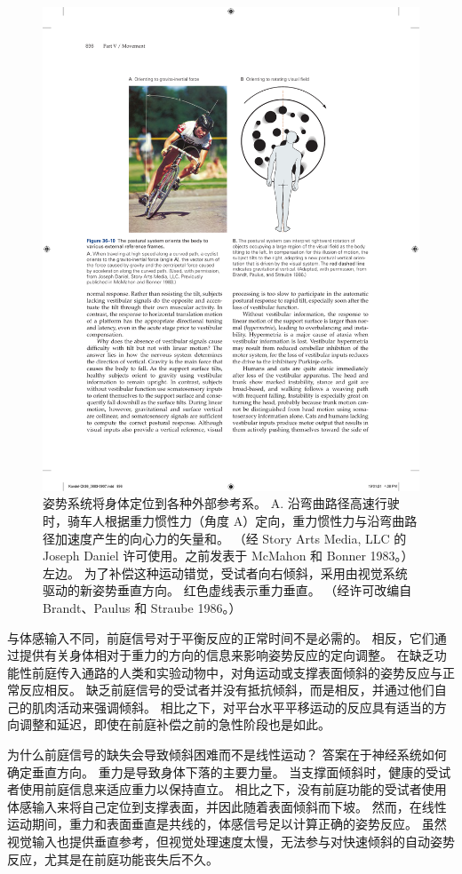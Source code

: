 \begin{figure}[htbp]
	\centering
	\includegraphics[width=0.7\linewidth]{chap36/fig_36_10}
	\caption{姿势系统将身体定位到各种外部参考系。 A. 沿弯曲路径高速行驶时，骑车人根据重力惯性力（角度 A）定向，重力惯性力与沿弯曲路径加速度产生的向心力的矢量和。 （经 Story Arts Media, LLC 的 Joseph Daniel 许可使用。之前发表于 McMahon 和 Bonner 1983。） 左边。 为了补偿这种运动错觉，受试者向右倾斜，采用由视觉系统驱动的新姿势垂直方向。 红色虚线表示重力垂直。 （经许可改编自 Brandt、Paulus 和 Straube 1986。）}
	\label{fig:36_10}
\end{figure}

与体感输入不同，前庭信号对于平衡反应的正常时间不是必需的。 相反，它们通过提供有关身体相对于重力的方向的信息来影响姿势反应的定向调整。 在缺乏功能性前庭传入通路的人类和实验动物中，对角运动或支撑表面倾斜的姿势反应与正常反应相反。 缺乏前庭信号的受试者并没有抵抗倾斜，而是相反，并通过他们自己的肌肉活动来强调倾斜。 相比之下，对平台水平平移运动的反应具有适当的方向调整和延迟，即使在前庭补偿之前的急性阶段也是如此。

为什么前庭信号的缺失会导致倾斜困难而不是线性运动？ 答案在于神经系统如何确定垂直方向。 重力是导致身体下落的主要力量。 当支撑面倾斜时，健康的受试者使用前庭信息来适应重力以保持直立。 相比之下，没有前庭功能的受试者使用体感输入来将自己定位到支撑表面，并因此随着表面倾斜而下坡。 然而，在线性运动期间，重力和表面垂直是共线的，体感信号足以计算正确的姿势反应。 虽然视觉输入也提供垂直参考，但视觉处理速度太慢，无法参与对快速倾斜的自动姿势反应，尤其是在前庭功能丧失后不久。

